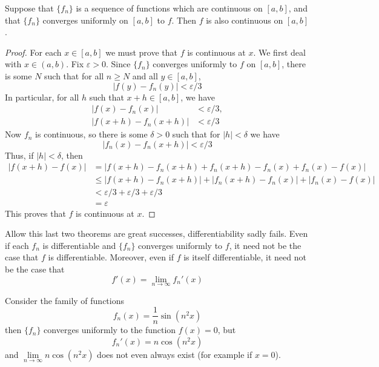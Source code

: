 \documentclass[12pt, a4paper, oneside, openright, titlepage]{book}
\begin{document}
\begin{thm}
    Suppose that $\{f_n\}$ is a sequence of functions which are continuous on $[a,b]$, and that $\{f_n\}$ converges uniformly on $[a,b]$ to $f$. Then $f$ is also continuous on $[a,b]$.
\end{thm}
\begin{proof}
    For each $x \in [a,b]$ we must prove that $f$ is continuous at $x$. We first deal with $x \in (a,b)$. Fix $\varepsilon > 0$. Since $\{f_n\}$ converges uniformly to $f$ on $[a,b]$, there is some $N$ such that for all $n \geq N$ and all $y \in [a,b]$, \begin{equation*}
        |f(y) - f_n(y)| < \varepsilon/3
    \end{equation*}
    In particular, for all $h$ such that $x+ h \in [a,b]$, we have \begin{align*}
        |f(x) - f_n(x)| &< \varepsilon/3, \\
        |f(x+h) - f_n(x+h)| &< \varepsilon/3
    \end{align*}
    Now $f_n$ is continuous, so there is some $\delta > 0$ such that for $|h| < \delta$ we have \begin{equation*}
        |f_n(x) - f_n(x+h)| < \varepsilon/3
    \end{equation*}
    Thus, if $|h| < \delta$, then \begin{align*}
        |f(x+h)-f(x)| &= |f(x+h)-f_n(x+h)+f_n(x+h) - f_n(x)+f_n(x)-f(x)| \\
        &\leq |f(x+h) - f_n(x+h)| + |f_n(x+h)-f_n(x)| + |f_n(x) - f(x)| \\
        &<\varepsilon/3 + \varepsilon/3 + \varepsilon/3 \\
        &= \varepsilon
    \end{align*}
    This proves that $f$ is continuous at $x$.
\end{proof}

\begin{rmk}
    Allow this last two theorems are great successes, differentiability sadly fails. Even if each $f_n$ is differentiable and $\{f_n\}$ converges uniformly to $f$, it need not be the case that $f$ is differentiable. Moreover, even if $f$ is itself differentiable, it need not be the case that \begin{equation*}
        f'(x) = \lim\limits_{n\rightarrow \infty}f_n'(x)
    \end{equation*}
\end{rmk}

\begin{eg}
    Consider the family of functions \begin{equation*}
        f_n(x) = \frac{1}{n}\sin(n^2x)
    \end{equation*}
    then $\{f_n\}$ converges uniformly to the function $f(x) = 0$, but \begin{equation*}
        f_n'(x) = n\cos(n^2x)
    \end{equation*}
    and $\lim\limits_{n\rightarrow\infty}n\cos(n^2x)$ does not even always exist (for example if $x =0$).
\end{eg}
\end{document}

